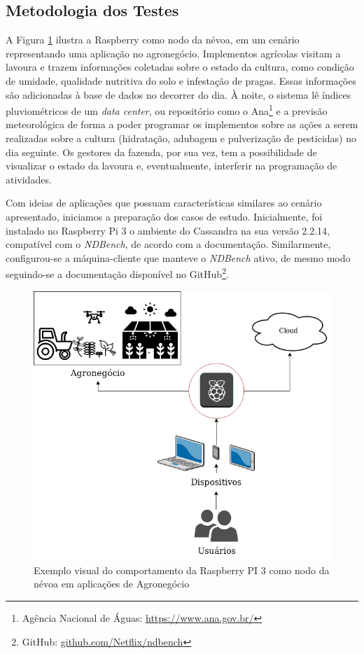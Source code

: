 \documentclass[12pt,english,brazil]{article}
\begin{document}
\subsection{Metodologia dos Testes}\label{sec:MetodologiaDosTestes}

A Figura \ref{fig:my_label} ilustra a Raspberry como nodo da névoa, em um cenário representando uma aplicação no agronegócio. Implementos agrícolas visitam a lavoura e trazem informações coletadas sobre o estado da cultura, como condição de umidade, qualidade nutritiva do solo e infestação de pragas. Essas informações são adicionadas à base de dados no decorrer do dia. À noite, o sistema lê índices pluviométricos de um \textit{data center}, ou repositório como o Ana\footnote{Agência Nacional de Águas: \url{https://www.ana.gov.br/}} e a previsão meteorológica de forma a poder programar os implementos sobre as ações a serem realizadas sobre a cultura (hidratação, adubagem e pulverização de pesticidas) no dia seguinte. Os gestores da fazenda, por sua vez, tem a possibilidade de visualizar o estado da lavoura e, eventualmente, interferir na programação de atividades.

Com ideias de aplicações que possuam características similares ao cenário apresentado, iniciamos a preparação dos casos de estudo. Inicialmente, foi instalado no Raspberry Pi 3 o ambiente do Cassandra na sua versão 2.2.14, compatível com o \textit{NDBench}, de acordo com a documentação. Similarmente, configurou-se a máquina-cliente que manteve o \textit{NDBench} ativo, de mesmo modo seguindo-se a documentação disponível no GitHub\footnote{GitHub: \url{github.com/Netflix/ndbench}}.

\begin{figure}[!ht]
    \centering
    \includegraphics[scale=0.5]{novaimagem.png}
    \caption{Exemplo visual do comportamento da Raspberry PI 3 como nodo da névoa em aplicações de Agronegócio}
    \label{fig:my_label}
\end{figure}{}
\end{document}
